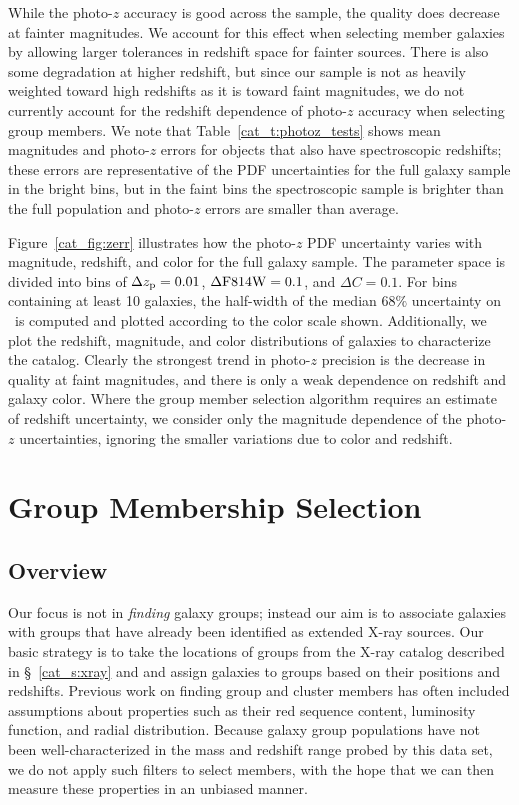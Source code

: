 While the photo-$z$ accuracy is good across the sample, the quality does
decrease at fainter magnitudes. We account for this effect when
selecting member galaxies by allowing larger tolerances in redshift
space for fainter sources. There is also some degradation at higher redshift,
but since our sample is not as heavily weighted toward high redshifts
as it is toward faint magnitudes, we do not currently account for the
redshift dependence of photo-$z$ accuracy when selecting group members.
We note that Table~\ref{cat_t:photoz_tests} shows mean magnitudes and
photo-$z$ errors for objects that also have spectroscopic redshifts;
these errors are representative of the PDF uncertainties for the full
galaxy sample in the bright bins, but in the faint bins the
spectroscopic sample is brighter than the full population and
photo-$z$ errors are smaller than average.

Figure~\ref{cat_fig:zerr} illustrates how the photo-$z$ PDF uncertainty varies with
magnitude, redshift, and color for the full galaxy sample. The parameter space is divided into
bins of $\Delta\mbox{$z_{\rm p}$}=0.01$, $\Delta \rm{F814W}=0.1$, and $\Delta C=0.1$. For
bins containing at least 10 galaxies, the half-width of the median
$68\%$ uncertainty on \pz\ is computed and plotted according to the
color scale shown. Additionally, we plot the redshift, magnitude, and
color distributions of galaxies to characterize the catalog. Clearly
the strongest trend in photo-$z$ precision is the decrease in quality at
faint magnitudes, and there is only a weak dependence on redshift and galaxy
color. Where the group member selection
algorithm requires an estimate of redshift uncertainty, we consider
only the magnitude dependence of the photo-$z$ uncertainties, ignoring
the smaller variations due to color and redshift.



\section{Group Membership Selection}
\label{cat_s:membership}
\subsection{Overview}

Our focus is not in \textit{finding} galaxy groups; instead our aim is to
associate galaxies with groups that have already been identified as
extended X-ray sources. Our basic strategy is to take the locations of
groups from the X-ray catalog described in \S~\ref{cat_s:xray} and
\citet[][and in prep.]{Finoguenov2007} and assign galaxies
to groups based on their positions and redshifts. Previous work on
finding group and cluster members has often included assumptions about
properties such as their red sequence content, luminosity function, and radial
distribution. Because galaxy group populations have not been
well-characterized in the mass and redshift range probed by this data 
set, we do not apply such filters to select members, with the hope
that we can then measure these properties in an unbiased manner.

